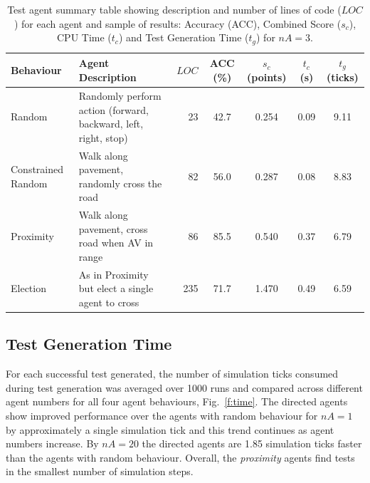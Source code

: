 \documentclass[runningheads,a4paper]{llncs}
\begin{document}
\begin{table}
\centering
\caption{Test agent summary table showing description and number of lines of code ($LOC$) for each agent and sample of results: Accuracy (ACC), Combined Score ($s_c$), CPU Time ($t_{c}$) and Test Generation Time ($t_{g}$) for $nA=3$.}
\label{t:ResultsTable}
\begin{tabular}{|p{2.1cm}|p{4.0cm}|r||c|c|c|c|}
\hline
\textbf{Behaviour} & \textbf{Agent Description} & $LOC$ & ACC (\%) & $s_c$ (points)&  $t_{c}$ (s) & $t_{g}$ (ticks) \\
\hline
Random & Randomly perform action (forward, backward, left, right, stop) &  23& 42.7 & 0.254 & 0.09 & 9.11 \\
Constrained Random & Walk along pavement, randomly cross the road 		&  82& 56.0 & 0.287 & 0.08 & 8.83 \\
Proximity & Walk along pavement, cross road when AV in range 			&  86& 85.5 & 0.540 & 0.37 & 6.79 \\
Election & As in Proximity but elect a single agent to cross 			& 235& 71.7 & 1.470 & 0.49 & 6.59 \\
\hline 
\end{tabular}
\end{table}


\subsection{Test Generation Time}
For each successful test generated, the number of simulation ticks consumed during test generation was averaged over 1000 runs and compared across different agent numbers for all four agent behaviours, Fig.~\ref{f:time}. 
%
The directed agents show improved performance over the agents with random behaviour for $nA=1$ by approximately a single simulation tick and this trend continues as agent numbers increase. By $nA=20$ the directed agents are 1.85 simulation ticks faster than the agents with random behaviour. Overall, the \textit{proximity} agents find tests in the smallest number of simulation steps.
\end{document}

